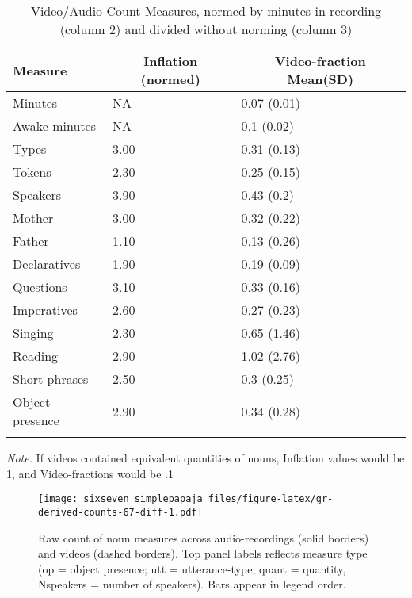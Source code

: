 \documentclass[man]{apa6}
\theoremstyle{definition}
\theoremstyle{definition}
\theoremstyle{definition}
\theoremstyle{remark}
\begin{document}
\begin{table}[tbp]
\begin{center}
\begin{threeparttable}
\caption{\label{tab:normtable}Video/Audio Count Measures, normed by minutes in recording (column 2) and divided without norming (column 3)}
\small{
\begin{tabular}{lll}
\toprule
Measure & \multicolumn{1}{c}{Inflation (normed)} & \multicolumn{1}{c}{Video-fraction Mean(SD)}\\
\midrule
Minutes & NA & 0.07 (0.01)\\
Awake minutes & NA & 0.1 (0.02)\\
Types & 3.00 & 0.31 (0.13)\\
Tokens & 2.30 & 0.25 (0.15)\\
Speakers & 3.90 & 0.43 (0.2)\\
Mother & 3.00 & 0.32 (0.22)\\
Father & 1.10 & 0.13 (0.26)\\
Declaratives & 1.90 & 0.19 (0.09)\\
Questions & 3.10 & 0.33 (0.16)\\
Imperatives & 2.60 & 0.27 (0.23)\\
Singing & 2.30 & 0.65 (1.46)\\
Reading & 2.90 & 1.02 (2.76)\\
Short phrases & 2.50 & 0.3 (0.25)\\
Object presence & 2.90 & 0.34 (0.28)\\
\bottomrule
\addlinespace
\end{tabular}
}
\begin{tablenotes}[para]
\textit{Note.} If videos contained equivalent quantities of nouns, Inflation values would be 1, and Video-fractions would be .1
\end{tablenotes}
\end{threeparttable}
\end{center}
\end{table}

\begin{figure}
\centering
\texttt{[image: sixseven\_simplepapaja\_files/figure-latex/gr-derived-counts-67-diff-1.pdf]}
\caption{\label{fig:gr-derived-counts-67-diff}Raw count of noun measures
across audio-recordings (solid borders) and videos (dashed borders). Top
panel labels reflects measure type (op = object presence; utt =
utterance-type, quant = quantity, Nspeakers = number of speakers). Bars
appear in legend order.}
\end{figure}
\end{document}
